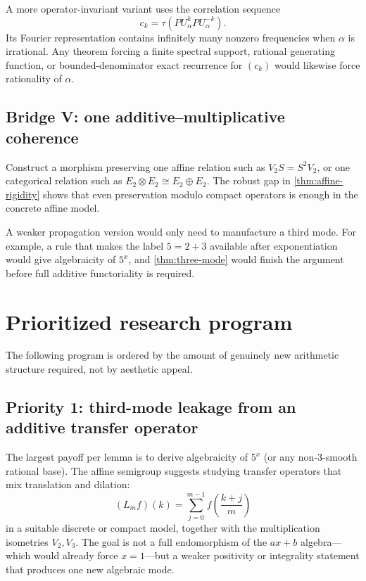 \documentclass[11pt,oneside]{article}
\theoremstyle{definition}
\theoremstyle{remark}
\begin{document}
A more operator-invariant variant uses the correlation sequence
\[
        c_k=\tau(PU_\alpha^kPU_\alpha^{-k}).
\]
Its Fourier representation contains infinitely many nonzero frequencies
when \(\alpha\) is irrational.  Any theorem forcing a finite spectral
support, rational generating function, or bounded-denominator exact
recurrence for \((c_k)\) would likewise force rationality of
\(\alpha\).

\subsection{Bridge V: one additive--multiplicative coherence}

Construct a morphism preserving one affine relation such as
\(V_2S=S^2V_2\), or one categorical relation such as
\(E_2\otimes E_2\cong E_2\oplus E_2\).  The robust gap in
\cref{thm:affine-rigidity} shows that even preservation modulo compact
operators is enough in the concrete affine model.

A weaker propagation version would only need to manufacture a third
mode.  For example, a rule that makes the label \(5=2+3\) available
after exponentiation would give algebraicity of \(5^x\), and
\cref{thm:three-mode} would finish the argument before full additive
functoriality is required.

\section{Prioritized research program}

The following program is ordered by the amount of genuinely new
arithmetic structure required, not by aesthetic appeal.

\subsection{Priority 1: third-mode leakage from an additive transfer operator}

The largest payoff per lemma is to derive algebraicity of \(5^x\) (or
any non-\(3\)-smooth rational base).  The affine semigroup suggests
studying transfer operators that mix translation and dilation:
\[
        (L_mf)(k)=\sum_{j=0}^{m-1}f\!\left(\frac{k+j}{m}\right)
\]
in a suitable discrete or compact model, together with the
multiplication isometries \(V_2,V_3\).  The goal is not a full
endomorphism of the \(ax+b\) algebra---which would already force
\(x=1\)---but a weaker positivity or integrality statement that produces
one new algebraic mode.
\end{document}
